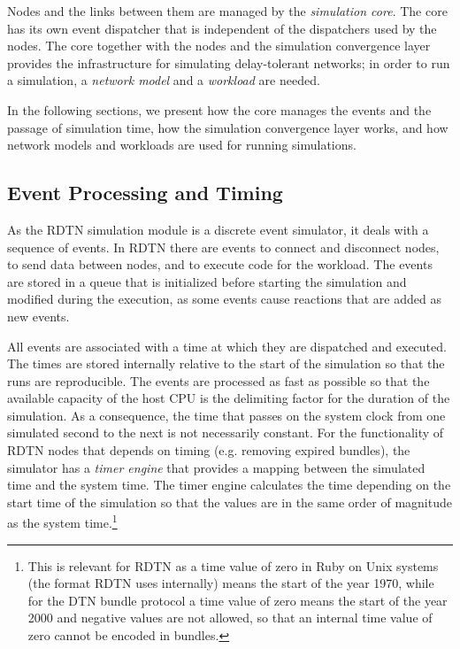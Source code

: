 \documentclass[a4paper]{article}
\begin{document}
Nodes and the links between them are managed by the {\em simulation core}.  The
core has its own event dispatcher that is independent of the dispatchers used by
the nodes. The core together with the nodes and the simulation convergence layer
provides the infrastructure for simulating delay-tolerant networks; in order to
run a simulation, a {\em network model} and a {\em workload} are needed. 

In the following sections, we present how the core manages the events and the
passage of simulation time, how the simulation convergence layer works, and how
network models and workloads are used for running simulations.

\subsection{Event Processing and Timing}\label{sec.sim.events}

As the RDTN simulation module is a discrete event simulator, it deals with a
sequence of events. In RDTN there are events to connect and disconnect nodes, to
send data between nodes, and to execute code for the workload. The events are
stored in a queue that is initialized before starting the simulation and
modified during the execution, as some events cause reactions that are added as
new events.

All events are associated with a time at which they are dispatched and executed.
The times are stored internally relative to the start of the simulation so that
the runs are reproducible. The events are processed as fast as possible so that
the available capacity of the host CPU is the delimiting factor for the duration
of the simulation. As a consequence, the time that passes on the system clock
from one simulated second to the next is not necessarily constant.  For the
functionality of RDTN nodes that depends on timing (e.g. removing expired
bundles), the simulator has a {\em timer engine} that provides a mapping between
the simulated time and the system time.  The timer engine calculates the time
depending on the start time of the simulation so that the values are in the same
order of magnitude as the system time.\footnote{This is relevant for RDTN as a
time value of zero in Ruby on Unix systems (the format RDTN uses internally)
means the start of the year 1970, while for the DTN bundle protocol a time value
of zero means the start of the year 2000 and negative values are not allowed, so
that an internal time value of zero cannot be encoded in bundles.}
\end{document}
